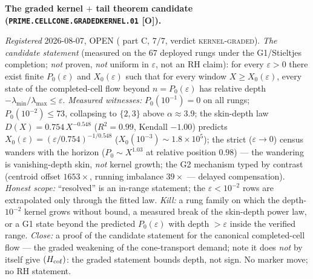 \par\smallskip\noindent\textbf{The graded kernel $+$ tail
theorem candidate
(\texttt{PRIME.CELLCONE.\allowbreak GRADEDKERNEL.01} [O]).}
{\sloppy
\emph{Registered} 2026-08-07, OPEN
( part C, $7/7$, verdict
\textsc{kernel-graded}).  \emph{The candidate statement}
(measured on the $67$ deployed rungs under the G1/Stieltjes
completion; \emph{not} proven, \emph{not} uniform in
$\varepsilon$, not an RH claim): for every $\varepsilon > 0$
there exist finite $P_0(\varepsilon)$ and $X_0(\varepsilon)$
such that for every window $X \ge X_0(\varepsilon)$, every state
of the completed-cell flow beyond $n = P_0(\varepsilon)$ has
relative depth $-\lambda_{\min}/\lambda_{\max} \le \varepsilon$.
\emph{Measured witnesses:} $P_0(10^{-1}) = 0$ on all rungs;
$P_0(10^{-2}) \le 73$, collapsing to $\{2, 3\}$ above $\alpha
\approx 3.9$; the skin-depth law $D(X) = 0.754\,X^{-0.548}$
($R^2 = 0.99$, Kendall $-1.00$) predicts $X_0(\varepsilon) =
(\varepsilon/0.754)^{-1/0.548}$ ($X_0(10^{-3}) \sim
1.8\times10^{5}$); the strict ($\varepsilon \to 0$) census
wanders with the horizon ($P_0 \sim X^{1.03}$ at relative
position $0.98$) --- the wandering is vanishing-depth skin,
\emph{not} kernel growth; the G2 mechanism typed by contrast
(centroid offset $1653\times$, running imbalance $39\times$ ---
delayed compensation).  \emph{Honest scope:} ``resolved'' is an
in-range statement; the $\varepsilon < 10^{-2}$ rows are
extrapolated only through the fitted law.  \emph{Kill:} a rung
family on which the depth-$10^{-2}$ kernel grows without bound,
a measured break of the skin-depth power law, or a G1 state
beyond the predicted $P_0(\varepsilon)$ with depth $>
\varepsilon$ inside the verified range.  \emph{Close:} a proof
of the candidate statement for the canonical completed-cell flow
--- the graded weakening of the cone-transport demand; note it
does \emph{not} by itself give $(H_{\rm cof})$: the graded
statement bounds depth, not sign.  No marker move; no RH
statement.\par}


